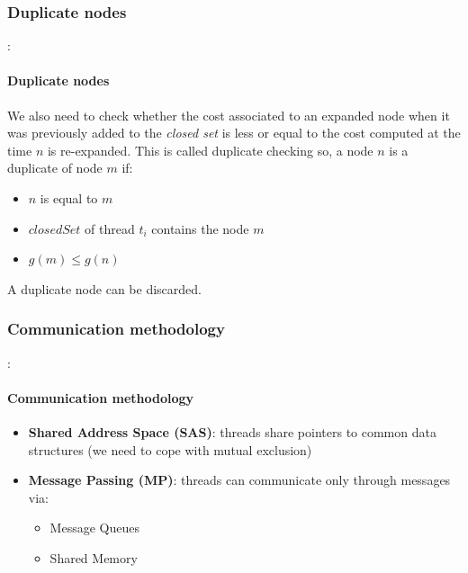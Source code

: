 \documentclass[12pt]{beamer}
\begin{document}
	\subsubsection{Duplicate nodes}
	\begin{frame}{\secname : \subsecname}
		\framesubtitle{Duplicate nodes}
		We also need to check whether the cost associated to an expanded node 
		when it was previously added to the \textit{closed set} is less or equal to the cost computed at the time $n$ is re-expanded. 
		This is called duplicate checking so, a node $n$ is a duplicate of node $m$ if:
		\begin{itemize} 
			\item $n$ is equal to $m$
			\item $closedSet$ of thread $t_i$ contains the node $m$
			\item $g(m) \le g(n)$
		\end{itemize}
		A duplicate node can be discarded.
	\end{frame}
	\subsubsection{Communication methodology}
	\begin{frame}{\secname : \subsecname}
		\framesubtitle{Communication methodology}
		\begin{itemize}
			\item \textbf{Shared Address Space (SAS)}: threads share pointers to common data structures (we need
			to cope with mutual exclusion)
			\item \textbf{Message Passing (MP)}: threads can communicate only through messages via:
			\begin{itemize}
				\item Message Queues
				\item Shared Memory
			\end{itemize}
		\end{itemize}
	\end{frame}
\end{document}
